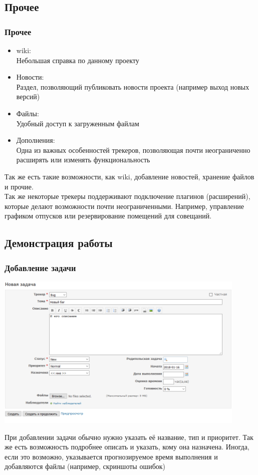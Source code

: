 \documentclass{../industrial-development}
\begin{document}
\subsection{Прочее}
\begin{frame} \frametitle{Прочее}
	\begin{itemize}
		\item wiki:\\
		Небольшая справка по данному проекту		
		\item Новости:\\
		Раздел, позволяющий публиковать новости проекта (например выход новых версий)
		\item Файлы:\\
		Удобный доступ к загруженным файлам
		\item Дополнения:\\
		Одна из важных особенностей трекеров, позволяющая почти неограниченно расширять или изменять функциональность
	\end{itemize}
\end{frame}
\lecturenotes
Так же есть такие возможности, как wiki, добавление новостей, хранение файлов и прочие.\\
Так же некоторые трекеры поддерживают подключение плагинов (расширений), которые делают возможности почти неограниченными. Например, управление графиком отпусков или резервирование помещений для совещаний.

\subsection{Демонстрация работы}
\begin{frame} \frametitle{Добавление задачи}
\centerline{\includegraphics[width=0.9\textwidth]{adding.png}}
\end{frame}
\lecturenotes
При добавлении задачи обычно нужно указать её название, тип и приоритет. Так же есть возможность подробнее описать и указать, кому она назначена. Иногда, если это возможно, указывается прогнозируемое время выполнения и добавляются файлы (например, скриншоты ошибок)
\end{document}
